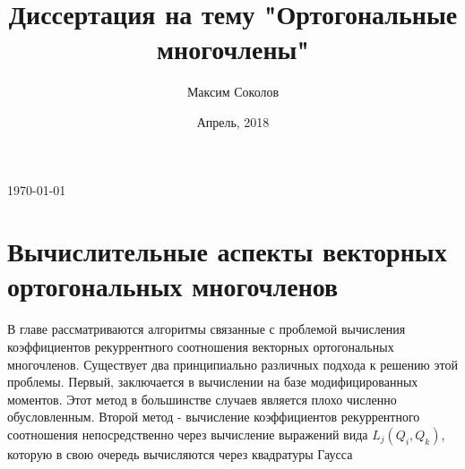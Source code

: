 \documentclass{report}
\title{Диссертация на тему "Ортогональные многочлены"}
\author{Максим Соколов}
\date{Апрель, 2018}
\begin{document}

\begin{flushright}
\today
\tableofcontents
\end{flushright}













\chapter{Вычислительные аспекты векторных ортогональных многочленов}
В главе рассматриваются алгоритмы связанные с проблемой
вычисления коэффициентов рекуррентного соотношения векторных
ортогональных многочленов. Существует два принципиально различных
подхода к решению этой проблемы. Первый, заключается в вычислении
на базе модифицированных моментов. Этот метод в большинстве
случаев является плохо численно обусловленным. Второй метод -
вычисление коэффициентов рекуррентного соотношения
непосредственно через вычисление выражений вида $L_j(Q_i,Q_k)$,
которую в свою очередь вычисляются через квадратуры Гаусса




\end{document}
